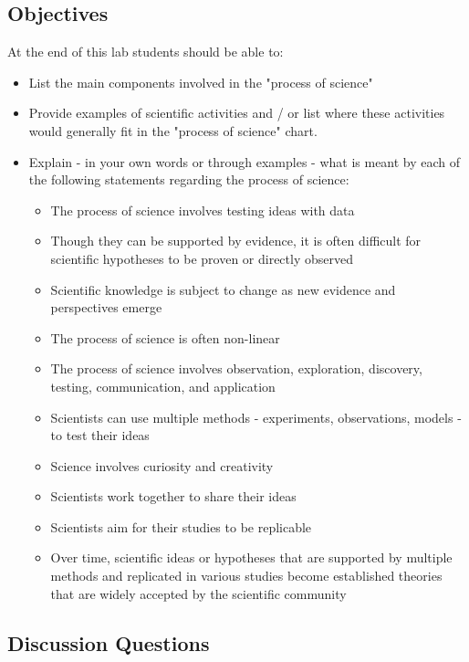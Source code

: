 \documentclass[
]{book}
\providecommand{\tightlist}{%
  \setlength{\itemsep}{0pt}\setlength{\parskip}{0pt}}
\begin{document}
\hypertarget{objectives}{%
\subsection*{Objectives}\label{objectives}}

At the end of this lab students should be able to:

\begin{itemize}
\tightlist
\item
  List the main components involved in the "process of science"
\item
  Provide examples of scientific activities and / or list where these activities would generally fit in the "process of science" chart.
\item
  Explain - in your own words or through examples - what is meant by each of the following statements regarding the process of science:

  \begin{itemize}
  \tightlist
  \item
    The process of science involves testing ideas with data
  \item
    Though they can be supported by evidence, it is often difficult for scientific hypotheses to be proven or directly observed
  \item
    Scientific knowledge is subject to change as new evidence and perspectives emerge
  \item
    The process of science is often non-linear
  \item
    The process of science involves observation, exploration, discovery, testing, communication, and application
  \item
    Scientists can use multiple methods - experiments, observations, models - to test their ideas
  \item
    Science involves curiosity and creativity
  \item
    Scientists work together to share their ideas
  \item
    Scientists aim for their studies to be replicable
  \item
    Over time, scientific ideas or hypotheses that are supported by multiple methods and replicated in various studies become established theories that are widely accepted by the scientific community
  \end{itemize}
\end{itemize}

\hypertarget{discussion-questions}{%
\subsection*{Discussion Questions}\label{discussion-questions}}
\end{document}
